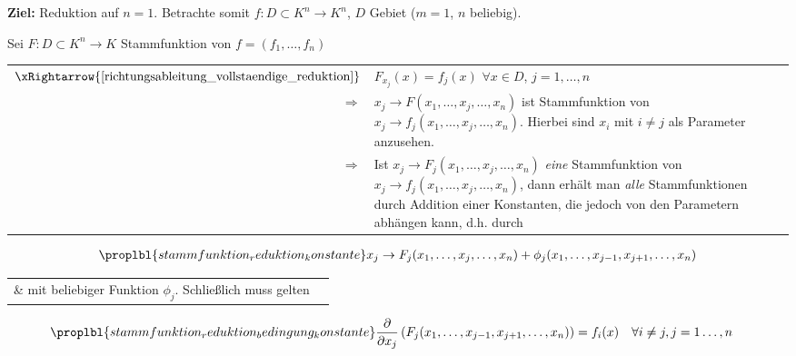 \textbf{Ziel:} Reduktion auf $n=1$. Betrachte somit $f:D\subset K^n\to K^n$, $D$ Gebiet ($m=1$, $n$ beliebig).
	
	Sei $F:D\subset K^n\to K$ Stammfunktion von $f=(f_1, \dotsc, f_n)$ \\
	\begin{tabularx}{\linewidth}{r@{\ \ }X}
	$\xRightarrow{\ref{richtungsableitung_vollstaendige_reduktion}}$ & $F_{x_j}(x) = f_j(x)$ $\forall x\in D$, $j = 1,\dotsc, n$ \\
	$\Rightarrow$ & $x_j \to F(x_1, \dotsc, x_j, \dotsc, x_n)$ ist Stammfunktion von $x_j \to f_j(x_1, \dotsc, x_j, \dotsc, x_n)$. Hierbei sind $x_i$ mit $i\neq j$ als Parameter anzusehen. \\
	$\Rightarrow$ & Ist $x_j \to F_j(x_1, \dotsc, x_j, \dotsc, x_n)$ \emph{eine} Stammfunktion von $x_j\to f_j(x_1, \dotsc, x_j, \dotsc, x_n)$, dann erhält man \emph{alle} Stammfunktionen durch Addition einer Konstanten, die jedoch von den Parametern abhängen kann, d.h. durch
	\end{tabularx}
	{
		 \zeroAmsmathAlignVSpaces
		\begin{align}\proplbl{stammfunktion_reduktion_konstante}
			x_j\to F_j(x_1, \dotsc, x_j, \dotsc, x_n) + \phi_j(x_1, \dotsc, x_{j-1}, x_{j+1}, \dotsc, x_n)
		\end{align}}
		\vspace*{1mm}
		\begin{tabularx}{\linewidth}{r@{\ \ }X}
		\parbox{\widthof{$\xRightarrow{\ref{richtungsableitung_vollstaendige_reduktion}}$}}{\hfill} & mit beliebiger Funktion $\phi_j$. Schließlich muss gelten
	\end{tabularx}
	\begin{align}
	\proplbl{stammfunktion_reduktion_bedingung_konstante}
	\frac{\partial}{\partial x_j} \left( F_j(x_1, \dotsc, x_{j-1}, x_{j+1}, \dotsc, x_n)\right) &= f_i(x)\quad\forall i\neq j, j=1\dotsc, n
	\end{align}

